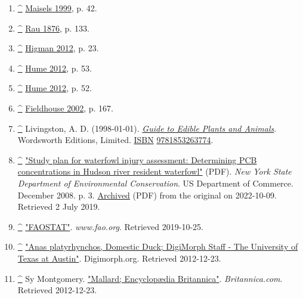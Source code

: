 \documentclass[11pt,a4paper]{article}
\begin{document}
\begin{enumerate}
\item \href{\#cite\_ref-FOOTNOTEMaisels199942\_37-0}{\textbf{\textasciicircum{}}} \href{\#CITEREFMaisels1999}{Maisels 1999}, p. 42.
\item \href{\#cite\_ref-FOOTNOTERau1876133\_38-0}{\textbf{\textasciicircum{}}} \href{\#CITEREFRau1876}{Rau 1876}, p. 133.
\item \href{\#cite\_ref-FOOTNOTEHigman201223\_39-0}{\textbf{\textasciicircum{}}} \href{\#CITEREFHigman2012}{Higman 2012}, p. 23.
\item \href{\#cite\_ref-FOOTNOTEHume201253\_40-0}{\textbf{\textasciicircum{}}} \href{\#CITEREFHume2012}{Hume 2012}, p. 53.
\item \href{\#cite\_ref-FOOTNOTEHume201252\_41-0}{\textbf{\textasciicircum{}}} \href{\#CITEREFHume2012}{Hume 2012}, p. 52.
\item \href{\#cite\_ref-FOOTNOTEFieldhouse2002167\_42-0}{\textbf{\textasciicircum{}}} \href{\#CITEREFFieldhouse2002}{Fieldhouse 2002}, p. 167.
\item \href{\#cite\_ref-43}{\textbf{\textasciicircum{}}} Livingston, A. D. (1998-01-01). \href{https://books.google.com/books?id=NViSMffyaSgC\&q=\%C2\%A0\%C2\%A0In+many+areas,+wild+ducks+of+various+species+are+hunted+for+food+or+sport}{\textit{Guide to Edible Plants and Animals}}. Wordsworth Editions, Limited. \href{/wiki/ISBN\_\%28identifier\%29}{ISBN} \href{/wiki/Special:BookSources/9781853263774}{9781853263774}.
\item \href{\#cite\_ref-44}{\textbf{\textasciicircum{}}} \href{https://www.dec.ny.gov/docs/fish\_marine\_pdf/wfp09a.pdf}{"Study plan for waterfowl injury assessment: Determining PCB concentrations in Hudson river resident waterfowl"} (PDF). \textit{New York State Department of Environmental Conservation}. US Department of Commerce. December 2008. p. 3. \href{https://ghostarchive.org/archive/20221009/https://www.dec.ny.gov/docs/fish\_marine\_pdf/wfp09a.pdf}{Archived} (PDF) from the original on 2022-10-09. Retrieved 2 July 2019.
\item \href{\#cite\_ref-45}{\textbf{\textasciicircum{}}} \href{http://www.fao.org/faostat/en/\#data/QL}{"FAOSTAT"}. \textit{www.fao.org}. Retrieved 2019-10-25.
\item \href{\#cite\_ref-46}{\textbf{\textasciicircum{}}} \href{http://digimorph.org/specimens/anas\_platyrhynchos/skull/}{"Anas platyrhynchos, Domestic Duck; DigiMorph Staff - The University of Texas at Austin"}. Digimorph.org. Retrieved 2012-12-23.
\item \href{\#cite\_ref-47}{\textbf{\textasciicircum{}}} Sy Montgomery. \href{https://www.britannica.com/eb/topic-360302/mallard}{"Mallard; Encyclopædia Britannica"}. \textit{Britannica.com}. Retrieved 2012-12-23.

\end{enumerate}
\end{document}
